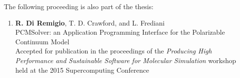 The following proceeding is also part of the thesis:
\begin{enumerate}
\item
  \textbf{R. Di Remigio}, T. D. Crawford, and L. Frediani
  \\
  PCMSolver: an Application Programming Interface
  for the Polarizable Continuum Model
  \\
  Accepted for publication in the proceedings of the
  \emph{Producing High Performance and Sustainable Software for
  Molecular Simulation} workshop held at the 2015 Supercomputing
  Conference
\label{SC15}
\end{enumerate}

